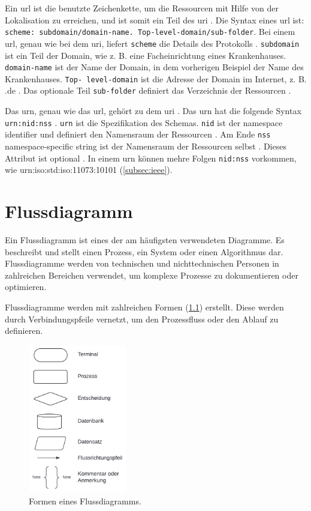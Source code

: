  Ein \acf{url} ist die benutzte Zeichenkette, um die Ressourcen mit Hilfe von der Lokalisation zu erreichen, und ist somit ein Teil des \ac{uri} \cite{uribibdiff2}. Die Syntax eines \ac{url} ist: \texttt{scheme: subdomain/domain-name. Top-level-domain/sub-folder}. Bei einem \ac{url}, genau wie bei dem \ac{uri}, liefert \texttt{scheme} die Details des Protokolls \cite{uribibdiff}. \texttt{subdomain} ist ein Teil der Domain, wie z. B. eine Facheinrichtung eines Krankenhauses. \texttt{domain-name} ist der Name der Domain, in dem vorherigen Beispiel der Name des Krankenhauses. \texttt{Top- level-domain} ist die Adresse der Domain im Internet, z. B. \glqq .de\grqq{} \cite{uribibdiff}. Das optionale Teil \texttt{sub-folder} definiert das Verzeichnis der Ressourcen \cite{uribibdiff, uribibdiff2}.
 
 Das \acf{urn}, genau wie das \ac{url}, gehört zu dem \ac{uri} \cite{uribibdiff}. Das \ac{urn} hat die folgende Syntax \texttt{urn:nid:nss} \cite{uribibdiff, uribibdiff2}. \texttt{urn} ist die Spezifikation des Schemas. \texttt{nid} ist der \glqq namespace identifier\grqq{} und definiert den Namensraum der Ressourcen \cite{uribibdiff}. Am Ende \texttt{nss} \glqq namespace-specific string\grqq{} ist der Namensraum der Ressourcen selbst \cite{uribibdiff}. Dieses Attribut ist optional \cite{uribibdiff2}. In einem \ac{urn} können mehre Folgen \texttt{nid:nss} vorkommen, wie urn:iso:std:iso:11073:10101 (\ref{subsec:ieee}).

 
 \chapter{Flussdiagramm} \label{sec:flowdiagram}
 
 Ein Flussdiagramm ist eines der am häufigsten verwendeten Diagramme. Es beschreibt und stellt einen Prozess, ein System oder einen Algorithmus dar. Flussdiagramme werden von technischen und nichttechnischen Personen in zahlreichen Bereichen verwendet, um komplexe Prozesse zu dokumentieren oder optimieren.
 
 Flussdiagramme werden mit zahlreichen Formen (\ref{fig:flowdiagramappen}) erstellt. Diese werden durch Verbindungspfeile vernetzt, um den Prozessfluss oder den Ablauf zu definieren.
 
 \begin{figure}[ht]
 	\centering
 	\includegraphics[height=6.5cm]{figures/flowdiagram}
 	\caption[Formen eines Flussdiagramms]{Formen eines Flussdiagramms.}
 	\label{fig:flowdiagramappen}
 \end{figure}
